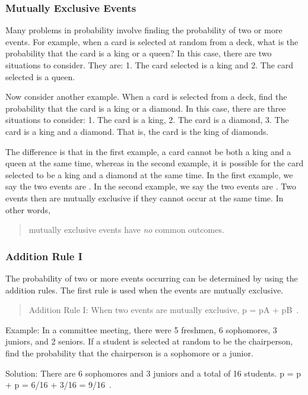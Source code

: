 \subsubsection{Mutually Exclusive Events}
Many problems in probability involve finding the probability of two or more events. For example, when a card is selected at random from a deck, what is the probability that the card is a king or a queen? In this case, there are two situations to consider. They are: 1. The card selected is a king and 2. The card selected is a queen.

Now consider another example. When a card is selected from a deck, find the probability that the card is a king or a diamond.
In this case, there are three situations to consider: 1. The card is a king, 2. The card is a diamond, 3. The card is a king and a diamond. That is, the card is the king of diamonds.

The difference is that in the first example, a card cannot be both a king and a queen at the same time, whereas in the second example, it is possible for the card selected to be a king and a diamond at the same time. In the first example, we say the two events are . In the second example, we say the two events are . Two events then are mutually exclusive if they cannot occur at the same time. In other words, 
\begin{quote}
mutually exclusive events have \emph{no} common outcomes.
\end{quote}


\subsubsection{Addition Rule I}
The probability of two or more events occurring can be determined by using the addition rules. The first rule is used when the events are mutually exclusive.

\begin{quote}
Addition Rule I: When two events are mutually exclusive, 
\beq
p = p\vat A + p\vat B \,.
\eeq
\end{quote}

Example: In a committee meeting, there were 5 freshmen, 6 sophomores, 3 juniors, and 2 seniors. If a student is selected at random to be the chairperson, find the probability that the chairperson is a sophomore or a junior.

Solution: There are 6 sophomores and 3 juniors and a total of 16 students.
\beq
p = p + p = 6/16 + 3/16 = 9/16 \,.
\eeq


